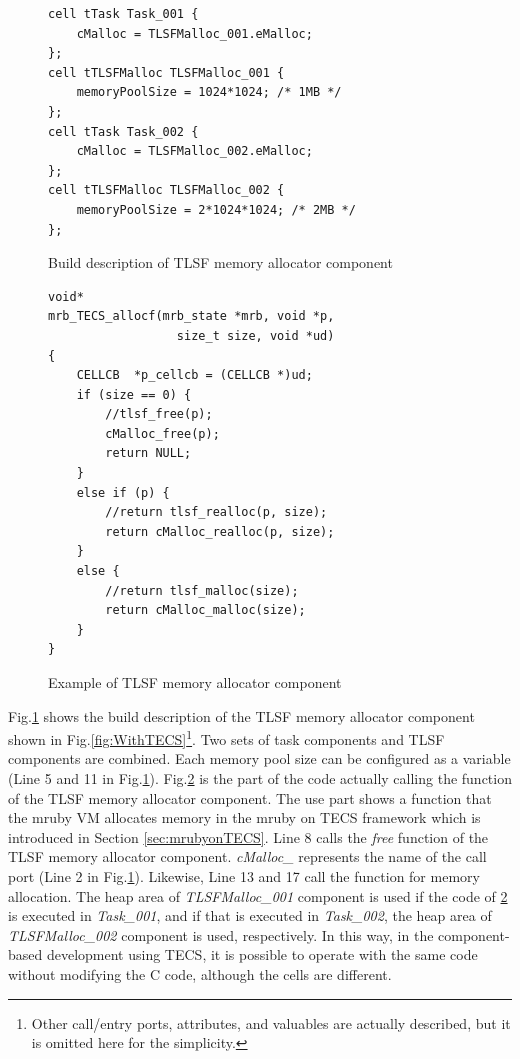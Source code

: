 \documentclass[JIP]{ipsj_v2/UTF8/ipsj}
\begin{document}
\begin{figure}[t]
\centering
\begin{lstlisting}
cell tTask Task_001 {
    cMalloc = TLSFMalloc_001.eMalloc;
};
cell tTLSFMalloc TLSFMalloc_001 {
    memoryPoolSize = 1024*1024; /* 1MB */
};
cell tTask Task_002 {
    cMalloc = TLSFMalloc_002.eMalloc;
};
cell tTLSFMalloc TLSFMalloc_002 {
    memoryPoolSize = 2*1024*1024; /* 2MB */
};
\end{lstlisting}
\caption{Build description of TLSF memory allocator component}
\label{src:TLSFBuild}
\end{figure}


\begin{figure}[t]
\centering
\begin{lstlisting}
void*
mrb_TECS_allocf(mrb_state *mrb, void *p, 
                  size_t size, void *ud)
{
    CELLCB	*p_cellcb = (CELLCB *)ud;
    if (size == 0) {
        //tlsf_free(p);
        cMalloc_free(p);
        return NULL;
    }
    else if (p) {
        //return tlsf_realloc(p, size);
        return cMalloc_realloc(p, size);
    }
    else {
        //return tlsf_malloc(size);
        return cMalloc_malloc(size);
    }
}
\end{lstlisting}
\caption{Example of TLSF memory allocator component}  
\label{src:TLSFC}
\end{figure}

Fig.\ref{src:TLSFBuild} shows the build description of the TLSF memory allocator component shown in Fig.\ref{fig:WithTECS}\footnote{Other call/entry ports, attributes, and valuables are actually described, but it is omitted here for the simplicity.}.
Two sets of task components and TLSF components are combined.
Each memory pool size can be configured as a variable (Line 5 and 11 in Fig.\ref{src:TLSFBuild}).
Fig.\ref{src:TLSFC} is the part of the code actually calling the function of the TLSF memory allocator component.
The use part shows a function that the mruby VM allocates memory in the mruby on TECS framework\cite{par:mrubyonTECS}\cite{par:mrubyonTECS2} which is introduced in Section \ref{sec:mrubyonTECS}.
Line 8 calls the {\it free} function of the TLSF memory allocator component.
{\it cMalloc\_} represents the name of the call port (Line 2 in Fig.\ref{src:TLSFBuild}).
Likewise, Line 13 and 17 call the function for memory allocation.
The heap area of {\it TLSFMalloc\_001} component is used if the code of \ref{src:TLSFC} is executed in {\it Task\_001}, and if that is executed in {\it Task\_002}, the heap area of {\it TLSFMalloc\_002} component is used, respectively.
In this way, in the component-based development using TECS, it is possible to operate with the same code without modifying the C code, although the cells are different.
\end{document}
